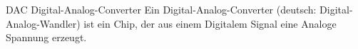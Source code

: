 
{DAC}%
{Digital-Analog-Converter}%
{Ein Digital-Analog-Converter (deutsch: Digital-Analog-Wandler) ist ein Chip, der aus einem Digitalem Signal eine Analoge Spannung erzeugt.}%